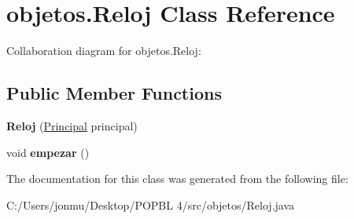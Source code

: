 \hypertarget{classobjetos_1_1_reloj}{}\section{objetos.\+Reloj Class Reference}
\label{classobjetos_1_1_reloj}


Collaboration diagram for objetos.\+Reloj\+:
\subsection*{Public Member Functions}
\begin{DoxyCompactItemize}
\item 
\mbox{\label{classobjetos_1_1_reloj_aa15ad3d750972a2e0778c54b07847b1a}} 
{\bfseries Reloj} (\mbox{\hyperlink{classvistas_1_1_principal}{Principal}} principal)
\item 
\mbox{\label{classobjetos_1_1_reloj_a8568b99d4457c01294d2078b033330a4}} 
void {\bfseries empezar} ()
\end{DoxyCompactItemize}


The documentation for this class was generated from the following file\+:\begin{DoxyCompactItemize}
\item 
C\+:/\+Users/jonmu/\+Desktop/\+P\+O\+P\+B\+L 4/src/objetos/Reloj.\+java\end{DoxyCompactItemize}

